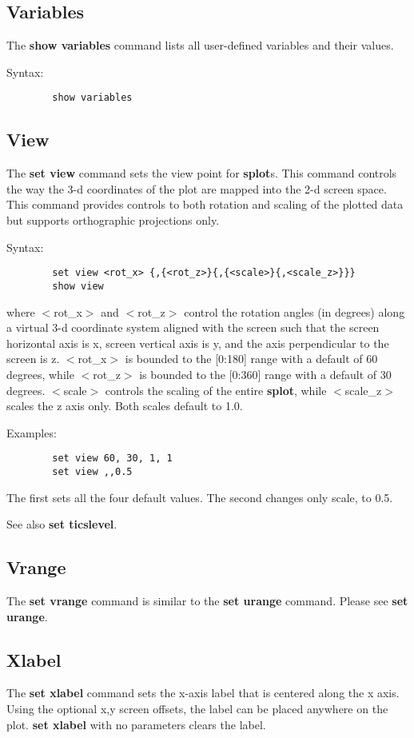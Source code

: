 \subsection{Variables}
The {\bf show variables} command lists all user-defined variables and
their values.

Syntax:
\begin{verbatim}
        show variables
\end{verbatim}
\subsection{View}
The {\bf set view} command sets the view point for {\bf splot}s. This
command controls the way the 3-d coordinates of the plot are mapped
into the 2-d screen space. This command provides controls to both
rotation and scaling of the plotted data but supports orthographic
projections only.

Syntax:
\begin{verbatim}
        set view <rot_x> {,{<rot_z>}{,{<scale>}{,<scale_z>}}}
        show view
\end{verbatim}

where $<$rot\_x$>$ and $<$rot\_z$>$ control the rotation angles (in degrees)
along a virtual 3-d coordinate system aligned with the screen such
that the screen horizontal axis is x, screen vertical axis is y, and
the axis perpendicular to the screen is z. $<$rot\_x$>$ is bounded to the
[0:180] range with a default of 60 degrees, while $<$rot\_z$>$ is bounded
to the [0:360] range with a default of 30 degrees. $<$scale$>$ controls
the scaling of the entire {\bf splot}, while $<$scale\_z$>$ scales the z axis
only. Both scales default to 1.0.

Examples:
\begin{verbatim}
        set view 60, 30, 1, 1
        set view ,,0.5
\end{verbatim}

The first sets all the four default values. The second changes 
only scale, to 0.5.

See also {\bf set ticslevel}.
\subsection{Vrange}
The {\bf set vrange} command is similar to the {\bf set urange} command.
Please see {\bf set urange}.
\subsection{Xlabel}
The {\bf set xlabel} command sets the x-axis label that is centered along
the x axis. Using the optional x,y screen offsets, the label can be
placed anywhere on the plot. {\bf set xlabel} with no parameters clears
the label.


